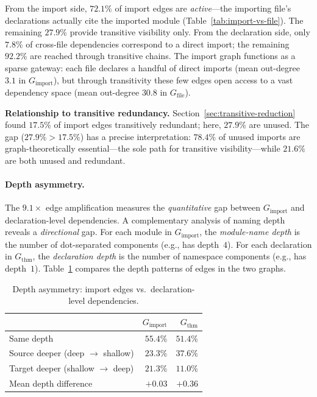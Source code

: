 From the import side, $72.1\%$ of import edges are \emph{active}---the importing file's declarations actually cite the imported module (Table~\ref{tab:import-vs-file}). The remaining $27.9\%$ provide transitive visibility only. From the declaration side, only $7.8\%$ of cross-file dependencies correspond to a direct import; the remaining $92.2\%$ are reached through transitive chains. The import graph functions as a sparse gateway: each file declares a handful of direct imports (mean out-degree $3.1$ in $G_{\mathrm{import}}$), but through transitivity these few edges open access to a vast dependency space (mean out-degree $30.8$ in $G_{\mathrm{file}}$).

\noindent\textbf{Relationship to transitive redundancy.}
\label{rem:unused-vs-redundant}
Section~\ref{sec:transitive-reduction} found $17.5\%$ of import edges transitively redundant; here, $27.9\%$ are unused. The gap ($27.9\% > 17.5\%$) has a precise interpretation: $78.4\%$ of unused imports are graph-theoretically essential---the sole path for transitive visibility---while $21.6\%$ are both unused and redundant.

\paragraph{Depth asymmetry.}
\label{sec:depth-asymmetry}

\noindent The $9.1\times$ edge amplification measures the \emph{quantitative} gap between $G_{\mathrm{import}}$ and declaration-level dependencies. A complementary analysis of naming depth reveals a \emph{directional} gap. For each module in $G_{\mathrm{import}}$, the \emph{module-name depth} is the number of dot-separated components (e.g.,  has depth~$4$). For each declaration in $G_{\mathrm{thm}}$, the \emph{declaration depth} is the number of namespace components (e.g.,  has depth~$1$). Table~\ref{tab:depth-asymmetry} compares the depth patterns of edges in the two graphs.

\begin{table}[ht]
\centering
\caption{Depth asymmetry: import edges vs.\ declaration-level dependencies.}
\label{tab:depth-asymmetry}
\begin{tabular}{lrr}
\toprule
& $G_{\mathrm{import}}$ & $G_{\mathrm{thm}}$ \\
\midrule
Same depth                         & $55.4\%$ & $51.4\%$ \\
Source deeper (deep $\to$ shallow) & $23.3\%$ & $37.6\%$ \\
Target deeper (shallow $\to$ deep) & $21.3\%$ & $11.0\%$ \\
Mean depth difference              & $+0.03$  & $+0.36$  \\
\bottomrule
\end{tabular}
\end{table}

